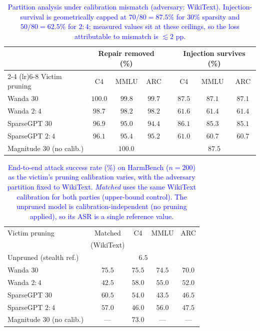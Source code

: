 {%
\begin{table}[t]
\centering
\small
{}      %
\begin{tabular}{l ccc c ccc}
\toprule
& \multicolumn{3}{c}{Repair removed (\%)} && \multicolumn{3}{c}{Injection survives (\%)} \\
\cmidrule(lr){2-4} \cmidrule(lr){6-8}
Victim pruning & C4 & MMLU & ARC && C4 & MMLU & ARC \\
\midrule
Wanda $30$      & $100.0$ & $99.8$ & $99.7$ && $87.5$ & $87.1$ & $87.1$ \\
Wanda $2{:}4$   & $98.7$  & $98.2$ & $98.2$ && $61.6$ & $61.4$ & $61.4$ \\
SparseGPT $30$    & $96.9$  & $95.0$ & $94.4$ && $86.1$ & $85.3$ & $85.1$ \\
SparseGPT $2{:}4$ & $96.1$  & $95.4$ & $95.2$ && $61.0$ & $60.7$ & $60.7$ \\
\midrule
Magnitude $30$ (no calib.) & \multicolumn{3}{c}{$100.0$} && \multicolumn{3}{c}{$87.5$} \\
\bottomrule
\end{tabular}
\caption{\textcolor{blue}{Partition analysis under calibration mismatch (adversary: WikiText).
Injection-survival is geometrically capped at $70/80{=}87.5\%$ for $30\%$ sparsity and
$50/80{=}62.5\%$ for $2{:}4$; measured values sit at these ceilings, so the loss attributable to
mismatch is $\lesssim 2$ pp.}}
\label{tab:calib-partition}
\end{table}

\begin{table}[t]
\centering
\small
{}
\begin{tabular}{l cccc}
\toprule
Victim pruning & Matched & C4 & MMLU & ARC \\
& (WikiText) & & & \\
\midrule
Unpruned (stealth ref.) & \multicolumn{4}{c}{$6.5$} \\
\midrule
Wanda $30$        & $75.5$ & $75.5$ & $74.5$ & $70.0$ \\
Wanda $2{:}4$     & $42.5$ & $58.0$ & $55.0$ & $52.0$ \\
SparseGPT $30$      & $60.5$ & $54.0$ & $43.5$ & $46.5$ \\
SparseGPT $2{:}4$   & $57.0$ & $46.0$ & $56.0$ & $47.5$ \\
Magnitude $30$ (no calib.) & --- & $73.0$ & --- & --- \\
\bottomrule
\end{tabular}
\caption{\textcolor{blue}{End-to-end attack success rate (\%) on HarmBench ($n{=}200$) as the
victim's pruning calibration varies, with the adversary partition fixed to WikiText. \emph{Matched}
uses the same WikiText calibration for both parties (upper-bound control). The unpruned model is
calibration-independent (no pruning applied), so its ASR is a single reference value.}}
\label{tab:calib-asr}
\end{table}
}  %
